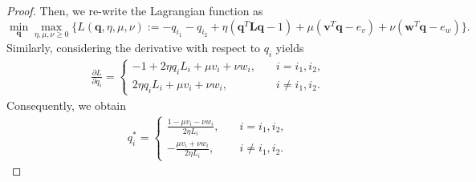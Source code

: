 \documentclass[11pt]{article}
\newcommand{\mat}[1]{\mathbf{#1}}
\renewcommand{\vec}[1]{\bm{#1}}
\begin{document}
\begin{proof}
Then, we re-write the Lagrangian function as
\begin{equation}
\label{Eq:min_max_2}
\min_{\vec{q}} \max_{\eta,\mu,\nu \geq 0}
\biggl\{ L(\vec{q},\eta,\mu,\nu)
:= - {{q}_{i_1} - {q}_{i_2} + \eta( \vec{q}^T\mat L\vec{q} - 1)+\mu( \vec{v}^T\vec{q} - e_v ) + \nu( \vec{w}^T\vec{q} - e_w )}
\biggr\}.
\end{equation}
Similarly, considering the derivative with respect to ${q}_i$ yields
\begin{equation*}
\begin{split}
\frac{\partial L}{\partial {q}_i} = \left\{
\begin{aligned}
-1 + 2\eta {q}_iL_{i} +\mu v_i + \nu w_i, \quad& i = i_1, i_2,\\
2\eta {q}_iL_{i} +\mu v_i + \nu w_i, \quad& i \neq i_1, i_2.
\end{aligned}
\right.
\end{split}
\label{eq:lang1}
\end{equation*}
Consequently, we obtain
\begin{equation*}
\begin{split}
q_i^{*} = \left\{
\begin{aligned}
\frac{1- \mu v_i - \nu w_i}{2\eta L_{i}}, \quad& i = i_1, i_2,\\
-\frac{\mu v_i + \nu w_i}{2\eta L_{i}}, \quad& i \neq i_1, i_2.
\end{aligned}
\right.
\end{split}
\end{equation*}


\end{proof}
\end{document}
